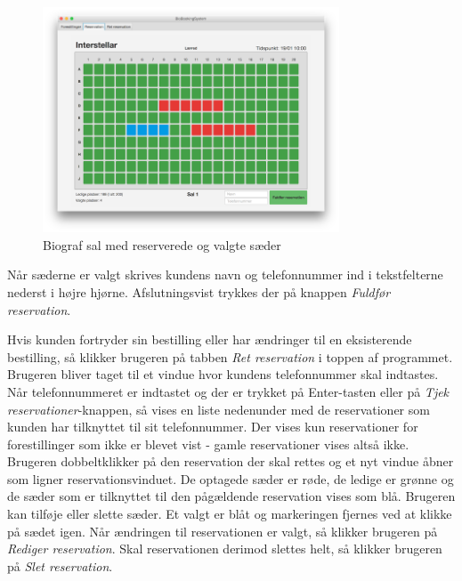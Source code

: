 \documentclass[final]{report}
\begin{document}
\begin{figure}[h]
    \centering
    \includegraphics[width=250pt]{3.png}
    \caption{Biograf sal med reserverede og valgte sæder}
\end{figure}

Når sæderne er valgt skrives kundens navn og telefonnummer ind i tekstfelterne nederst i højre hjørne. Afslutningsvist trykkes der på knappen \emph{Fuldfør reservation}. 

Hvis kunden fortryder sin bestilling eller har ændringer til en eksisterende bestilling, så klikker brugeren på tabben \emph{Ret reservation} i toppen af programmet. Brugeren bliver taget til et vindue hvor kundens telefonnummer skal indtastes. Når telefonnummeret er indtastet og der er trykket på Enter-tasten eller på \emph{Tjek reservationer}-knappen, så vises en liste nedenunder med de reservationer som kunden har tilknyttet til sit telefonnummer. Der vises kun reservationer for forestillinger som ikke er blevet vist - gamle reservationer vises altså ikke. Brugeren dobbeltklikker på den reservation der skal rettes og et nyt vindue åbner som ligner reservationsvinduet. De optagede sæder er røde, de ledige er grønne og de sæder som er tilknyttet til den pågældende reservation vises som blå. Brugeren kan tilføje eller slette sæder. Et valgt er blåt og markeringen fjernes ved at klikke på sædet igen. Når ændringen til reservationen er valgt, så klikker brugeren på \emph{Rediger reservation}. Skal reservationen derimod slettes helt, så klikker brugeren på \emph{Slet reservation}.
\end{document}
